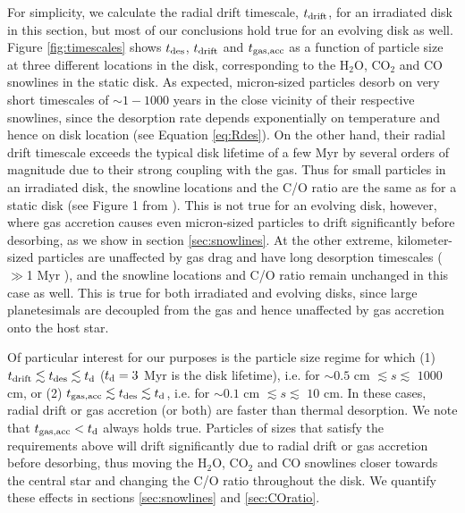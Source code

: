 \documentclass[apj]{emulateapj}
\newcommand{\emgr}[1]{\emph{ \color{gray} #1}}
\begin{document}
For simplicity, we calculate the radial drift timescale, $t_{\rm drift}$, for an irradiated disk in this section, but most of our conclusions hold true for an evolving disk as well. Figure \ref{fig:timescales} shows $t_{\rm des}$, $t_{\rm drift}$ and $t_{\rm gas, acc}$ as a function of particle size at three different locations in the disk, corresponding to the H$_2$O, CO$_2$ and CO snowlines in the static disk. As expected, micron-sized particles desorb on very short timescales of $\sim 1-1000$ years in the close vicinity of their respective snowlines, since the desorption rate depends exponentially on temperature and hence on disk location (see Equation \ref{eq:Rdes}).  On the other hand, their radial drift timescale exceeds the typical disk lifetime of a few Myr by several orders of magnitude due to their strong coupling with the gas. Thus for small particles in an irradiated disk, the snowline locations and the C/O ratio are the same as for a static disk (see Figure 1 from \citealt{oberg11}). This is not true for an evolving disk, however, where gas accretion causes even micron-sized particles to drift significantly before desorbing, as we show in section \ref{sec:snowlines}. At the other extreme, kilometer-sized particles are unaffected by gas drag and have long desorption timescales ($\gg$1 Myr ), and the snowline locations and C/O ratio remain unchanged in this case as well. This is true for both irradiated and evolving disks, since large planetesimals are decoupled from the gas and hence unaffected by gas accretion onto the host star. 

Of particular interest for our purposes is the particle size regime for which (1) $t_{\rm drift} \lesssim t_{\rm des} \lesssim t_{\rm d}$ ($t_{\rm d}=3$ Myr is the disk lifetime), i.e. for $\sim$$0.5$ cm $\lesssim s \lesssim$ $1000$ cm, or (2) $t_{\rm gas, acc} \lesssim t_{\rm des} \lesssim t_{\rm d}$, i.e. for $\sim$$0.1$ cm $\lesssim s \lesssim$ $10$ cm. In these cases, radial drift or gas accretion (or both) are faster than thermal desorption. We note that $t_{\rm gas, acc}<t_{\rm d}$ always holds true. Particles of sizes that satisfy the requirements above will drift significantly due to radial drift or gas accretion before desorbing, thus moving the H$_2$O, CO$_2$ and CO snowlines closer towards the central star and changing the C/O ratio throughout the disk. We quantify these effects in sections \ref{sec:snowlines} and \ref{sec:COratio}.



\end{document}
